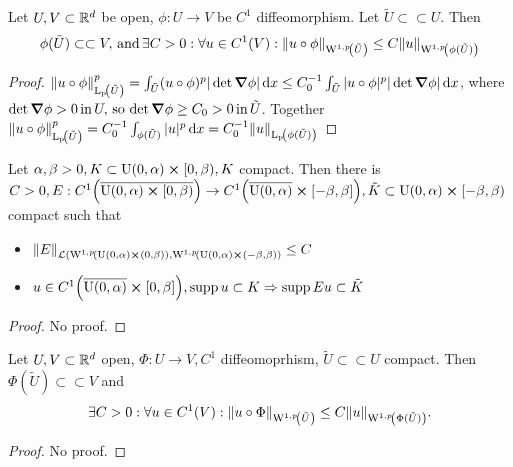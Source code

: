 \documentclass{article}
\begin{document}
\begin{lemma}
	Let $U,V \subset {\mathbb R}^d$ be open, $\phi: U \to V$ be $C^1$ diffeomorphism. Let $\tilde{U} \subset \subset U$. Then
	\[
		\phi(\tilde{U}) \subset \subset V,\, \text{and} \, \exists C>0: \forall u \in C^1(V): \norm{u \circ \phi}_{\WkpSet[1][p]{\tilde{U}}} \leq C \norm{u}_{\WkpSet[1][p]{\phi(\tilde{U})}}
	\]
\end{lemma}

\begin{proof}
	$\norm{u \circ \phi}_{\LpSet{\tilde{U}}}^p = \int_{\tilde{U}}(u \circ \phi)^p |\det \grad \phi| \dd{x} \leq C_0^{-1}\int_{\tilde{U}}|u \circ \phi|^p |\det \grad \phi|\dd{x}$, where $\det \grad \phi >0 \, \text{in} \,U, \, \text{so} \, \det \grad \phi \geq C_0 > 0 \, \text{in} \,\tilde{U}$. Together
	$\norm{u \circ \phi}_{\LpSet{\tilde{U}}}^p = C_0^{-1} \int_{\phi(\tilde{U})}|u|^p\dd{x} = C_0^{-1}\norm{u}_{\LpSet{\phi(\tilde{U})}}$
\end{proof}

\begin{lemma}
	Let $\alpha, \beta >0, K \subset \text{U}(0,\alpha) \cross [0,\beta), K$ compact. Then there is $C>0, E: C^1\qty(\overline{\text{U}(0,\alpha) \cross [0,\beta)}) \to C^1\qty(\overline{\text{U}(0,\alpha)} \cross [-\beta,\beta]), \tilde{K} \subset \text{U}(0,\alpha) \cross [-\beta, \beta)$ compact such that
	\begin{itemize}
		\item $\norm{E}_{\mathcal{L}(\WkpSet[1][p]{\text{U}(0,\alpha) \cross (0,\beta)}, \WkpSet[1][p]{\text{U}(0,\alpha)\cross(-\beta,\beta)}} \leq C$
		\item $u \in C^1\qty(\overline{\text{U}(0,\alpha)} \cross [0,\beta]), \operatorname{supp} u \subset K \Rightarrow \operatorname{supp} Eu \subset \tilde{K}$
	\end{itemize}
\end{lemma}
\begin{proof}
    No proof.
\end{proof}

\begin{lemma}
	Let $U,V \subset {\mathbb R}^d$ open, $\Phi: U \to V, C^1$ diffeomoprhism, $\tilde{U} \subset \subset U$ compact. Then $\Phi(\tilde{U}) \subset \subset V$ and
	\[
		\exists C>0: \forall u \in C^1\qty(V): \norm{u \circ \Phi}_{\WkpSet[1][p]{\tilde{U}}} \leq C \norm{u}_{\WkpSet[1][p]{\Phi(\tilde{U})}}.
	\]
	
\end{lemma}
\begin{proof}
    No proof.
\end{proof}
\end{document}

